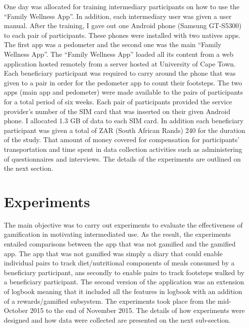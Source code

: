 One day was allocated for training intermediary participants on how to use the ``Family Wellness App''. In addition, each intermediary user was given a user manual. After the training, I gave out one Android phone (Samsung GT-S5300) to each pair of participants. These phones were installed with two natives apps. The first app was a pedometer and the second one was the main ``Family Wellness App''. The ``Family Wellness App'' loaded all its content from a web application hosted remotely from a server hosted at University of Cape Town. Each beneficiary participant was required to carry around the phone that was given to a pair in order for the pedometer app to count their footsteps. The two apps (main app and pedometer) were made available to the pairs of participants for a total period of six weeks. Each pair of participants provided the service provider's number of the SIM card that was inserted on their given Android phone. I allocated 1.3 GB of data to each SIM card. In addition each beneficiary participant was given a total of ZAR (South African Rands) 240 for the duration of the study. That amount of money covered for compensation for participants' transportation and time spent in data collection activities such as administering of questionnaires and interviews. The details of the experiments are outlined on the next section. 
\section{Experiments}
The main objective was to carry out experiments to evaluate the effectiveness of gamification in motivating  intermediated use. As the result, the experiments entailed comparisons between the app that was not gamified and the gamified app. The app that was not gamified was simply a diary that could enable individual pairs  to track diet/nutritional components of meals consumed by a beneficiary participant, ans secondly  to enable pairs to track footsteps walked by a beneficiary participant. The second version of the application was an extension of logbook meaning that it included all the features in logbook  with an addition of a rewards/gamified subsystem. The experiments took place from the mid-October 2015 to the end of November 2015.  The details of how experiments were designed and how data were collected are presented on the next sub-section.
